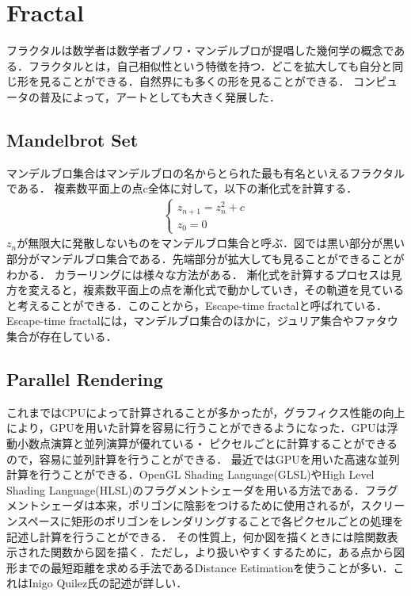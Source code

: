 \section{Fractal}
フラクタルは数学者は数学者ブノワ・マンデルブロが提唱した幾何学の概念である．フラクタルとは，自己相似性という特徴を持つ．どこを拡大しても自分と同じ形を見ることができる．自然界にも多くの形を見ることができる．
コンピュータの普及によって，アートとしても大きく発展した．

\subsection{Mandelbrot Set}
マンデルブロ集合はマンデルブロの名からとられた最も有名といえるフラクタルである．
複素数平面上の点c全体に対して，以下の漸化式を計算する．
\begin{eqnarray*}
 \begin{cases}
  z_{n+1} = z^2_{n} + c \\ z_0 = 0
 \end{cases}
\end{eqnarray*}
$z_n$が無限大に発散しないものをマンデルブロ集合と呼ぶ．図では黒い部分が黒い部分がマンデルブロ集合である．先端部分が拡大しても見ることができることがわかる．
カラーリングには様々な方法がある．
漸化式を計算するプロセスは見方を変えると，複素数平面上の点を漸化式で動かしていき，その軌道を見ていると考えることができる．このことから，Escape-time fractalと呼ばれている．Escape-time fractalには，マンデルブロ集合のほかに，ジュリア集合やファタウ集合が存在している．

\subsection{Parallel Rendering}
これまではCPUによって計算されることが多かったが，グラフィクス性能の向上により，GPUを用いた計算を容易に行うことができるようになった．GPUは浮動小数点演算と並列演算が優れている・
ピクセルごとに計算することができるので，容易に並列計算を行うことができる．
最近ではGPUを用いた高速な並列計算を行うことができる．OpenGL Shading Language(GLSL)やHigh Level Shading Language(HLSL)のフラグメントシェーダを用いる方法である．フラグメントシェーダは本来，ポリゴンに陰影をつけるために使用されるが，スクリーンスペースに矩形のポリゴンをレンダリングすることで各ピクセルごとの処理を記述し計算を行うことができる．
その性質上，何か図を描くときには陰関数表示された関数から図を描く．ただし，より扱いやすくするために，ある点から図形までの最短距離を求める手法であるDistance Estimationを使うことが多い．これはInigo Quilez氏の記述が詳しい．
